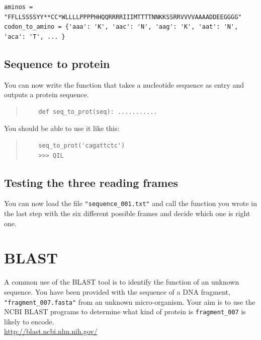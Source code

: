 \documentclass[a4paper,11pt]{article}
\begin{document}
\begin{verbatim}
aminos = "FFLLSSSSYY**CC*WLLLLPPPPHHQQRRRRIIIMTTTTNNKKSSRRVVVVAAAADDEEGGGG"
codon_to_amino = {'aaa': 'K', 'aac': 'N', 'aag': 'K', 'aat': 'N', 'aca': 'T', ... }
\end{verbatim}

\subsection{Sequence to protein}
You can now write the function that takes a nucleotide sequence as entry and outputs a protein sequence.

\begin{quote}
\begin{verbatim}
	def seq_to_prot(seq): ...........
\end{verbatim}
\end{quote}

You should be able to use it like this:
\begin{quote}
\begin{verbatim}
	seq_to_prot('cagattctc')
	>>> QIL
\end{verbatim}
\end{quote}

\subsection{Testing the three reading frames}
You can now load the file \texttt{"sequence\_001.txt"} and call the function you wrote in the last step with the six different possible frames and decide which one is right one.


\section{BLAST}
A common use of the BLAST tool is to identify the function of an unknown sequence. You have been provided with the sequence of a DNA fragment, \texttt{"fragment\_007.fasta"} from an unknown micro-organism. Your aim is to use the NCBI BLAST programs to determine what kind of protein is \texttt{fragment\_007} is likely to encode.\\

\url{http://blast.ncbi.nlm.nih.gov/}
\end{document}
